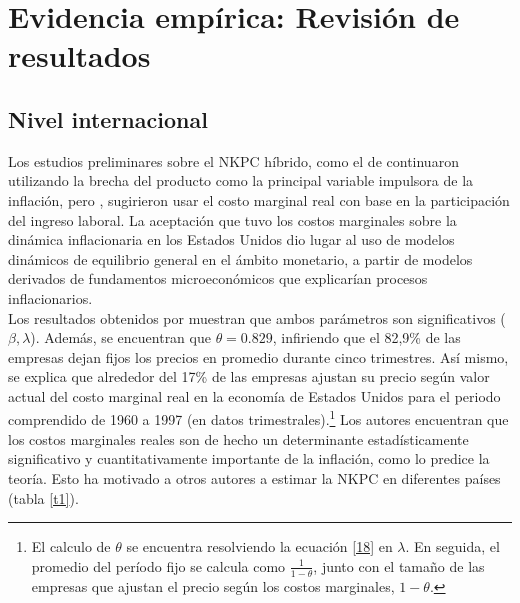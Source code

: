 \section{Evidencia empírica: Revisión de resultados}\label{sec3}
\subsection{Nivel internacional}\label{s141}
Los estudios preliminares sobre el NKPC híbrido, como el de \cite{fuhrer1995inflation}  continuaron utilizando la brecha del producto como la principal variable impulsora de la inflación, pero  \cite{gali1999inflation}, sugirieron usar el costo marginal real con base en la participación del ingreso laboral. La aceptación que tuvo los costos marginales sobre la dinámica inflacionaria en los Estados Unidos dio lugar al uso de modelos dinámicos de equilibrio general en el ámbito monetario, a partir de modelos derivados de fundamentos microeconómicos que explicarían procesos inflacionarios.\\

Los resultados  obtenidos por \cite{gali1999inflation} muestran que ambos parámetros son significativos ($\beta, \lambda$). Además, se encuentran que $\theta=0.829$, infiriendo que el 82,9\% de las empresas dejan fijos los precios en promedio durante cinco trimestres. Así mismo, se explica que alrededor del 17\% de las empresas ajustan su precio según valor actual del costo marginal real en la economía de Estados Unidos para el periodo comprendido de 1960 a 1997 (en datos trimestrales).\footnote{El calculo de $\theta$ se encuentra resolviendo la ecuación \eqref{18} en $\lambda$. En seguida, el promedio del período fijo se calcula como $\frac{1}{1-\theta}$, junto con el tamaño de las empresas que ajustan el precio según los costos marginales, $1-\theta$.} Los autores encuentran que los costos marginales reales son de hecho un determinante estadísticamente significativo y cuantitativamente importante de la inflación, como lo predice la teoría. Esto ha motivado a otros autores a estimar la NKPC en diferentes países (tabla \ref{t1}).

